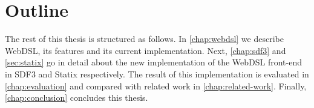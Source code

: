   \section{\label{sec:outline}Outline}
    The rest of this thesis is structured as follows. In \cref{chap:webdsl} we describe WebDSL, its features and its current implementation. Next, \cref{chap:sdf3} and \cref{sec:statix} go in detail about the new implementation of the WebDSL front-end in SDF3 and Statix respectively. The result of this implementation is evaluated in \cref{chap:evaluation} and compared with related work in \cref{chap:related-work}. Finally, \cref{chap:conclusion} concludes this thesis.

